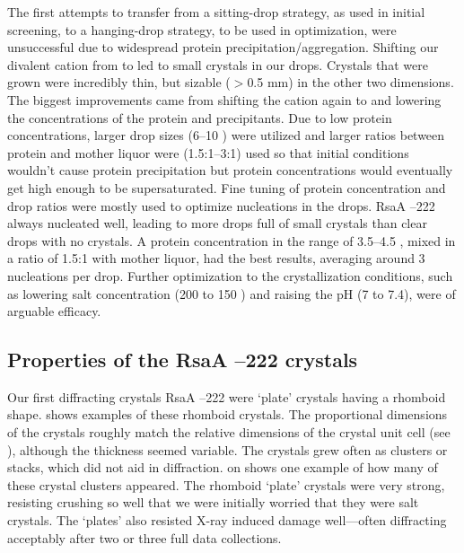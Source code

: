 The first attempts to transfer from a sitting-drop strategy, as used in initial screening, to a hanging-drop strategy, to be used in optimization, were unsuccessful due to widespread protein precipitation/aggregation. Shifting our divalent cation from  to  led to small crystals in our drops. Crystals that were grown  were incredibly thin, but sizable ($>$0.5 \si{\milli\meter}) in the other two dimensions. The biggest improvements came from shifting the cation again to  and lowering the concentrations of the protein and precipitants. Due to low protein concentrations, larger drop sizes (6--10 \microlitre) were utilized and larger ratios between protein and mother liquor were (1.5:1--3:1) used so that initial conditions wouldn't cause protein precipitation but protein concentrations would eventually get high enough to be supersaturated. Fine tuning of protein concentration and drop ratios were mostly used to optimize nucleations in the drops. RsaA --222 always nucleated well, leading to more drops full of small crystals than clear drops with no crystals. A protein concentration in the range of 3.5--4.5 \mgperml, mixed in a ratio of 1.5:1 with mother liquor, had the best results, averaging around 3 nucleations per drop. Further optimization to the crystallization conditions, such as lowering salt concentration (200 \millimolar to 150 \millimolar) and raising the pH (7 to 7.4), were of arguable efficacy. 

\subsection{Properties of the RsaA --222 crystals}\label{sec:properties-crystals}
Our first diffracting crystals RsaA --222 were `plate' crystals having a rhomboid shape.   shows examples of these rhomboid crystals. The proportional dimensions of the crystals roughly match the relative dimensions of the crystal unit cell (see ), although the thickness seemed variable. The crystals grew often as clusters or stacks, which did not aid in diffraction.  on  shows one example of how many of these crystal clusters appeared. The rhomboid `plate' crystals were very strong, resisting crushing so well that we were initially worried that they were salt crystals. The `plates' also resisted X-ray induced damage well---often diffracting acceptably after two or three full data collections. 

